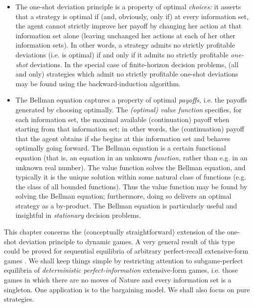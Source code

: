 \begin{itemize}

	\item The one-shot deviation principle is a property of optimal \emph{choices:} it asserts that a strategy is optimal if (and, obviously, only if) at every information set, the agent cannot strictly improve her payoff by changing her action at that information set alone (leaving unchanged her actions at each of her other information sets). In other words, a strategy admits no strictly profitable deviations (i.e. is optimal) if and only if it admits no strictly profitable \emph{one-shot} deviations. In the special case of finite-horizon decision problems, (all and only) strategies which admit no strictly profitable one-shot deviations may be found using the backward-induction algorithm.

	\item The Bellman equation captures a property of optimal \emph{payoffs,} i.e. the payoffs generated by choosing optimally. The \emph{(optimal) value function} specifies, for each information set, the maximal available (continuation) payoff when starting from that information set; in other words, the (continuation) payoff that the agent obtains if she begins at this information set and behaves optimally going forward. The Bellman equation is a certain functional equation (that is, an equation in an unknown \emph{function,} rather than e.g. in an unknown real number). The value function solves the Bellman equation, and typically it is the unique solution within some natural class of functions (e.g. the class of all bounded functions). Thus the value function may be found by solving the Bellman equation; furthermore, doing so delivers an optimal strategy as a by-product. The Bellman equation is particularly useful and insightful in \emph{stationary} decision problems.

\end{itemize}

This chapter concerns the (conceptually straightforward) extension of the one-shot deviation principle to dynamic games. A very general result of this type could be proved for sequential equilibria of arbitrary perfect-recall extensive-form games \parencite[see e.g.][Exercise~227.1]{OsborneRubinstein1994}. We shall keep things simple by restricting attention to subgame-perfect equilibria of \emph{deterministic perfect-information} extensive-form games, i.e. those games in which there are no moves of Nature and every information set is a singleton. One application is to the \textcite{Rubinstein1982} bargaining model. We shall also focus on pure strategies.

